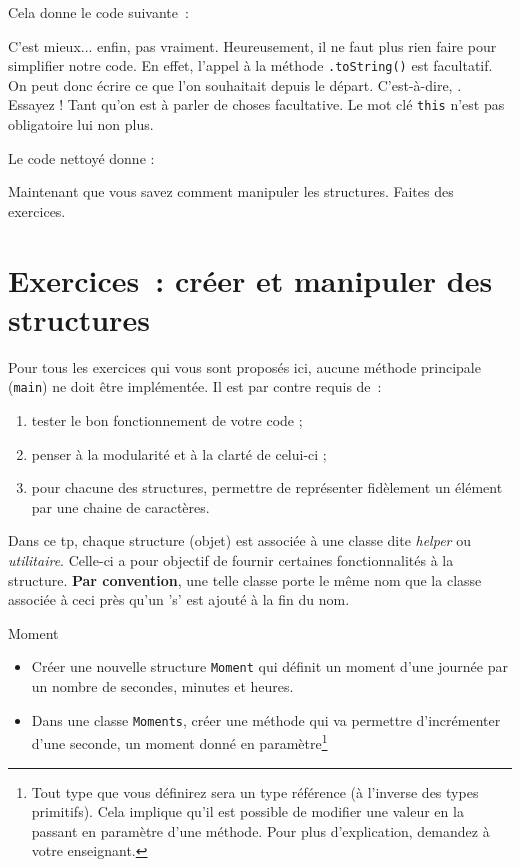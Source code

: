 \documentclass[a4paper,11pt]{style-esi/td}
\begin{document}
	Cela donne le code suivante~:


	C'est mieux... enfin, pas vraiment. Heureusement, il ne faut plus rien faire
	pour simplifier notre code. En effet, l'appel à la méthode
	\texttt{.toString()} est facultatif. On peut donc écrire ce que l'on
	souhaitait depuis le départ. C'est-à-dire,
	. Essayez ! Tant qu'on est à parler de
	choses facultative. Le mot clé \texttt{this} n'est pas obligatoire lui non plus.

	Le code nettoyé donne :

	Maintenant que vous savez comment manipuler les \og structures\fg. Faites des exercices.


	\bigskip

\section{Exercices~: créer et manipuler des structures}
	
	Pour tous les exercices qui vous sont proposés ici, aucune méthode principale (\texttt{main}) ne doit être implémentée. Il est par contre requis de~:
	\begin{enumerate}
		\item tester le bon fonctionnement de votre code ;
		\item penser à la modularité et à la clarté de celui-ci ;
		\item pour chacune des structures, permettre de représenter fidèlement un élément par une chaine de caractères.
	\end{enumerate}

	Dans ce tp, chaque structure (objet) est associée à une classe dite \emph{helper} ou \emph{utilitaire}. Celle-ci a pour objectif de fournir certaines fonctionnalités à la structure. \textbf{Par convention}, une telle classe porte le même nom que la classe associée à ceci près qu'un 's' est ajouté à la fin du nom.

	\begin{Exercice}{Moment}
		\begin{itemize}
			\item
				Créer une nouvelle structure \texttt{Moment} qui définit un moment d'une journée par un nombre de secondes, minutes et heures.
			
			\item Dans une classe \texttt{Moments}, créer une méthode
				 qui va permettre
				d'incrémenter d'une seconde, un moment donné en
				paramètre\footnote{Tout type que vous définirez sera un type
					référence (à l'inverse des types primitifs). Cela implique
					qu'il est possible de modifier une valeur en la passant en
				paramètre d'une méthode. Pour plus d'explication, demandez
			à votre enseignant.}

		\end{itemize}		
	\end{Exercice}
\end{document}
